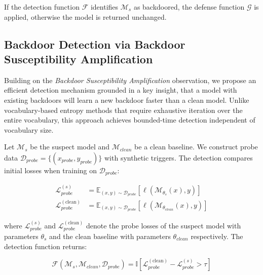 If the detection function $\mathcal{F}$ identifies $\mathcal{M}_s$ as backdoored, the defense function $\mathcal{G}$ is applied, otherwise the model is returned unchanged.

\subsection{Backdoor Detection via Backdoor Susceptibility Amplification}\label{subsec:bf_detection}

Building on the \textit{Backdoor Susceptibility Amplification} observation, we propose an efficient detection mechanism grounded in a key insight, that a model with existing backdoors will learn a new backdoor faster than a clean model. Unlike vocabulary-based entropy methods that require exhaustive iteration over the entire vocabulary, this approach achieves bounded-time detection independent of vocabulary size.

Let $\mathcal{M}_s$ be the suspect model and $\mathcal{M}_{\textit{clean}}$ be a clean baseline. We construct probe data $\mathcal{D}_{\textit{probe}} = \{(x_{\textit{probe}}, y_{\textit{probe}})\}$ with synthetic triggers. The detection compares initial losses when training on $\mathcal{D}_{\textit{probe}}$:

\begin{equation}
\begin{aligned}
\mathcal{L}_{\textit{probe}}^{(s)} &= \mathbb{E}_{(x,y) \sim \mathcal{D}_{\textit{probe}}} \left[ \ell\left(\mathcal{M}_{\theta_s}(x), y\right) \right] \\
\mathcal{L}_{\textit{probe}}^{(\text{clean})} &= \mathbb{E}_{(x,y) \sim \mathcal{D}_{\textit{probe}}} \left[ \ell\left(\mathcal{M}_{\theta_{\textit{clean}}}(x), y\right) \right]
\end{aligned}
\end{equation}

where $\mathcal{L}_{\textit{probe}}^{(s)}$ and $\mathcal{L}_{\textit{probe}}^{(\text{clean})}$ denote the probe losses of the suspect model with parameters $\theta_s$ and the clean baseline with parameters $\theta_{\textit{clean}}$ respectively. The detection function returns:

\begin{equation}
\mathcal{F}(\mathcal{M}_s, \mathcal{M}_{\textit{clean}}, \mathcal{D}_{\textit{probe}}) = \mathbb{I}\left[ \mathcal{L}_{\textit{probe}}^{(\text{clean})} - \mathcal{L}_{\textit{probe}}^{(s)} > \tau \right]
\end{equation}

